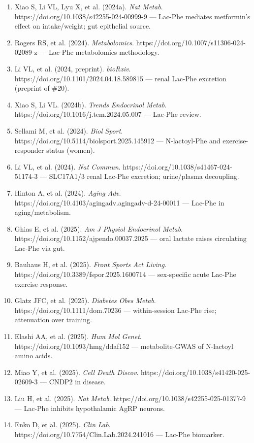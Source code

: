 \documentclass[11pt]{article}
\begin{document}
\begin{enumerate}
\item Xiao S, Li VL, Lyu X, et al. (2024a). \textit{Nat Metab}. https://doi.org/10.1038/s42255-024-00999-9 --- Lac-Phe mediates metformin's effect on intake/weight; gut epithelial source.
\item Rogers RS, et al. (2024). \textit{Metabolomics}. https://doi.org/10.1007/s11306-024-02089-z --- Lac-Phe metabolomics methodology.
\item Li VL, et al. (2024, preprint). \textit{bioRxiv}. https://doi.org/10.1101/2024.04.18.589815 --- renal Lac-Phe excretion (preprint of \#20).
\item Xiao S, Li VL. (2024b). \textit{Trends Endocrinol Metab}. https://doi.org/10.1016/j.tem.2024.05.007 --- Lac-Phe review.
\item Sellami M, et al. (2024). \textit{Biol Sport}. https://doi.org/10.5114/biolsport.2025.145912 --- N-lactoyl-Phe and exercise-responder status (women).
\item Li VL, et al. (2024). \textit{Nat Commun}. https://doi.org/10.1038/s41467-024-51174-3 --- SLC17A1/3 renal Lac-Phe excretion; urine/plasma decoupling.
\item Hinton A, et al. (2024). \textit{Aging Adv}. https://doi.org/10.4103/agingadv.agingadv-d-24-00011 --- Lac-Phe in aging/metabolism.
\item Ghias E, et al. (2025). \textit{Am J Physiol Endocrinol Metab}. https://doi.org/10.1152/ajpendo.00037.2025 --- oral lactate raises circulating Lac-Phe via gut.
\item Bauhaus H, et al. (2025). \textit{Front Sports Act Living}. https://doi.org/10.3389/fspor.2025.1600714 --- sex-specific acute Lac-Phe exercise response.
\item Glatz JFC, et al. (2025). \textit{Diabetes Obes Metab}. https://doi.org/10.1111/dom.70236 --- within-session Lac-Phe rise; attenuation over training.
\item Elashi AA, et al. (2025). \textit{Hum Mol Genet}. https://doi.org/10.1093/hmg/ddaf152 --- metabolite-GWAS of N-lactoyl amino acids.
\item Miao Y, et al. (2025). \textit{Cell Death Discov}. https://doi.org/10.1038/s41420-025-02609-3 --- CNDP2 in disease.
\item Liu H, et al. (2025). \textit{Nat Metab}. https://doi.org/10.1038/s42255-025-01377-9 --- Lac-Phe inhibits hypothalamic AgRP neurons.
\item Enko D, et al. (2025). \textit{Clin Lab}. https://doi.org/10.7754/Clin.Lab.2024.241016 --- Lac-Phe biomarker.

\end{enumerate}
\end{document}
